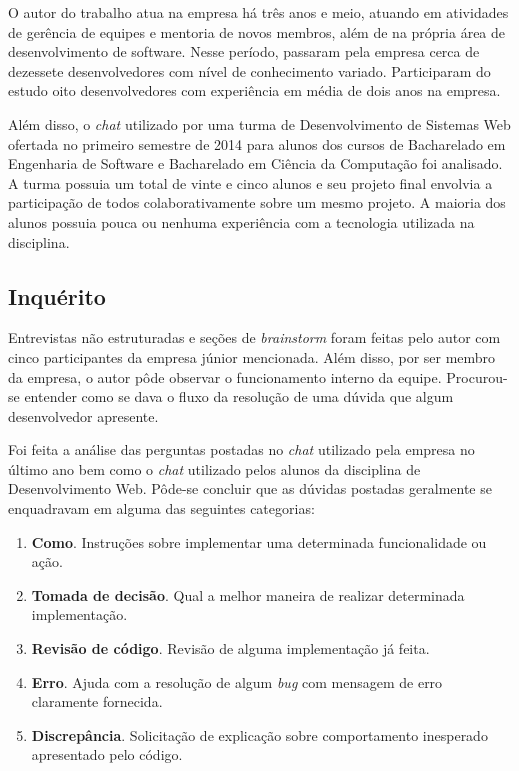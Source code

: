 O autor do trabalho atua na empresa há três anos e meio, atuando em atividades de gerência de equipes e mentoria de novos membros, além de na própria área de desenvolvimento de software. Nesse período, passaram pela empresa cerca de dezessete desenvolvedores com nível de conhecimento variado. Participaram do estudo oito desenvolvedores com experiência em média de dois anos na empresa.


Além disso, o \textit{chat} utilizado por uma turma de Desenvolvimento de Sistemas Web ofertada no primeiro semestre de 2014 para alunos dos cursos de Bacharelado em Engenharia de Software e Bacharelado em Ciência da Computação foi analisado. A turma possuia um total de vinte e cinco alunos e seu projeto final envolvia a participação de todos colaborativamente sobre um mesmo projeto. A maioria dos alunos possuia pouca ou nenhuma experiência com a tecnologia utilizada na disciplina.


\subsection{Inquérito}

Entrevistas não estruturadas e seções de \textit{brainstorm} foram feitas pelo autor com cinco participantes da empresa júnior mencionada. Além disso, por ser membro da empresa, o autor pôde observar o funcionamento interno da equipe. Procurou-se entender como se dava o fluxo da resolução de uma dúvida que algum desenvolvedor apresente.

Foi feita a análise das perguntas postadas no \textit{chat} utilizado pela empresa no último ano bem como o \textit{chat} utilizado pelos alunos da disciplina de Desenvolvimento Web. Pôde-se concluir que as dúvidas postadas geralmente se enquadravam em alguma das seguintes categorias:

\begin{enumerate}
  \item \textbf{Como}. Instruções sobre implementar uma determinada funcionalidade ou ação.
  \item \textbf{Tomada de decisão}. Qual a melhor maneira de realizar determinada implementação.
  \item \textbf{Revisão de código}. Revisão de alguma implementação já feita.
  \item \textbf{Erro}. Ajuda com a resolução de algum \textit{bug} com mensagem de erro claramente fornecida.
  \item \textbf{Discrepância}. Solicitação de explicação sobre comportamento inesperado apresentado pelo código.
\end{enumerate}

